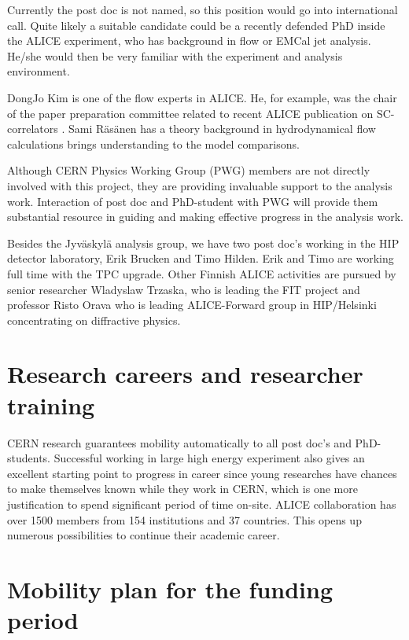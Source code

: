 Currently the post doc is not named, so this position would go into international call. Quite likely a suitable candidate could be a recently defended PhD inside the ALICE experiment, who has background in flow or EMCal jet analysis. He/she would then be very familiar with the experiment and analysis environment.

DongJo Kim is one of the flow experts in ALICE. He, for example, was the chair of the paper preparation committee related to recent ALICE publication on SC-correlators \cite{Acharya:2017gsw}. Sami R\"as\"anen has a theory background in hydrodynamical flow calculations brings understanding to the model comparisons.

Although CERN Physics Working Group (PWG) members are not directly involved with this project, they are providing invaluable support to the analysis work. Interaction of post doc and PhD-student with PWG will provide them substantial resource in guiding and making effective progress in the analysis work.

Besides the Jyv\"askyl\"a analysis group, we have two post doc's working in the HIP detector laboratory, Erik Brucken and Timo Hilden. Erik and Timo are working full time with the TPC upgrade. Other Finnish ALICE activities are pursued by senior researcher Wladyslaw Trzaska, who is leading the FIT project and professor Risto Orava who is leading ALICE-Forward group in HIP/Helsinki concentrating on diffractive physics.

\section{Research careers and researcher training}%
\label{sec:career}

CERN research guarantees mobility automatically to all post doc's and PhD-students. Successful working in large high energy experiment also gives an excellent starting point to progress in career since young researches have chances to make themselves known while they work in CERN, which is one more justification to spend significant period of time on-site. ALICE collaboration has over 1500 members from 154 institutions and 37 countries. This opens up numerous possibilities to continue their academic career.

\section{Mobility plan for the funding period}%
\label{sec:mobility}

